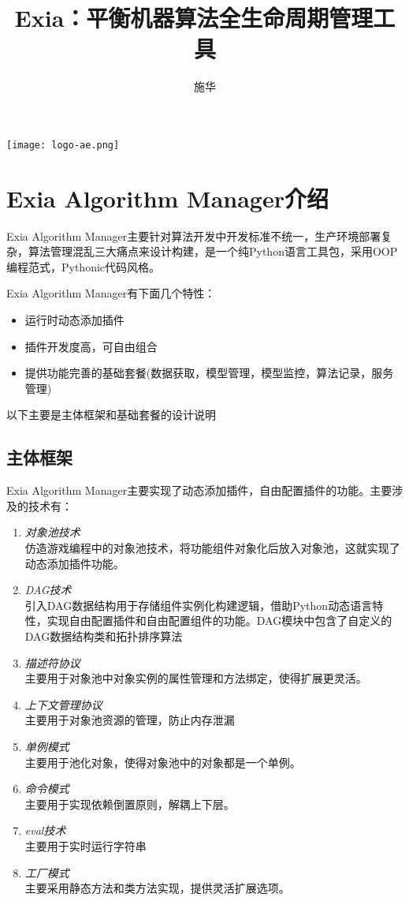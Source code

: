 \documentclass[cn,hazy,blue,14pt,screen]{elegantnote}
\title{Exia：平衡机器算法全生命周期管理工具}
\author{施华}
\institute{Exia Algorithm Manager}
\date{\zhtoday}
\begin{document}
\maketitle

\centerline{
  \texttt{[image: logo-ae.png]}
}



\section{Exia Algorithm Manager介绍}

Exia Algorithm Manager主要针对算法开发中开发标准不统一，生产环境部署复杂，算法管理混乱三大痛点来设计构建，是一个纯Python语言工具包，采用OOP编程范式，Pythonic代码风格。

Exia Algorithm Manager有下面几个特性：

\begin{itemize}
  \item 运行时动态添加插件
  \item 插件开发度高，可自由组合
  \item 提供功能完善的基础套餐(数据获取，模型管理，模型监控，算法记录，服务管理)
\end{itemize}

以下主要是主体框架和基础套餐的设计说明



\subsection{主体框架}

Exia Algorithm Manager主要实现了动态添加插件，自由配置插件的功能。主要涉及的技术有：

\begin{enumerate}[label=\arabic*).]
	\item \textit{对象池技术}\\
	仿造游戏编程中的对象池技术，将功能组件对象化后放入对象池，这就实现了动态添加插件功能。
	\item \textit{DAG技术}\\
	引入DAG数据结构用于存储组件实例化构建逻辑，借助Python动态语言特性，实现自由配置插件和自由配置组件的功能。DAG模块中包含了自定义的DAG数据结构类和拓扑排序算法
	\item \textit{描述符协议}\\
	主要用于对象池中对象实例的属性管理和方法绑定，使得扩展更灵活。
	\item \textit{上下文管理协议}\\
	主要用于对象池资源的管理，防止内存泄漏
	\item \textit{单例模式}\\
	主要用于池化对象，使得对象池中的对象都是一个单例。
	\item \textit{命令模式}\\
	主要用于实现依赖倒置原则，解耦上下层。
	\item \textit{eval技术}\\
	主要用于实时运行字符串
	\item \textit{工厂模式}\\
	主要采用静态方法和类方法实现，提供灵活扩展选项。
\end{enumerate}
\end{document}
